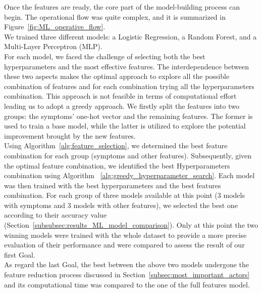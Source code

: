 Once the features are ready, the core part of the model-building process can begin. The operational flow was quite complex,
and it is summarized in Figure~\ref{fig:ML_operative_flow}.\\
We trained three different models: a Logistic Regression, a Random Forest, and a Multi-Layer Perceptron (MLP).\\
For each model, we faced the challenge of selecting both the best hyperparameters and the most effective features.
The interdependence between these two aspects makes the optimal approach to explore all the possible combination of features
and for each combination trying all the hyperparameters combination. This approach is not feasible in terms of computational effort
leading us to adopt a greedy approach. We firstly split the features into two
groups: the symptoms' one-hot vector and the remaining features. The former is used to train a base model,
while the latter is utilized to explore the potential improvement brought by the new features.\\
Using Algorithm~\ref{alg:feature_selection}, we determined the best feature combination for each group (symptoms and other features).
Subsequently, given the optimal feature combination, we identified the best Hyperparameters combination using Algorithm
~\ref{alg:greedy_hyperparameter_search}. Each model was then trained with the best hyperparameters and the best features combination.
For each group of three models available at this point (3 models with symptoms and 3 models with other features), we selected the best one
according to their accuracy value (Section~\ref{subsubsec:results_ML_model_comparison}).
Only at this point the two winning models were trained with the whole dataset to provide a more precise evaluation of their performance and
were compared to assess the result of our first Goal.\\
As regard the last Goal, the best between the above two models undergone the feature reduction process
discussed in Section~\ref{subsec:most_important_actors} and its computational time was compared to the one of the full features model.\\

